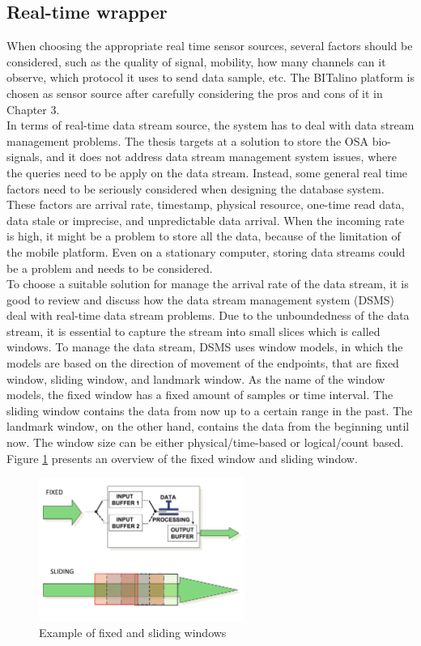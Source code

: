 \subsection{Real-time wrapper}
When choosing the appropriate real time sensor sources, several factors should be considered, such as the quality of signal, mobility, how many channels can it observe, which protocol it uses to send data sample, etc. The BITalino platform is chosen as sensor source after carefully considering the pros and cons of it in Chapter 3.\\
In terms of real-time data stream source, the system has to deal with data stream management problems. The thesis targets at a solution to store the OSA bio-signals, and it does not address data stream management system issues, where the queries need to be apply on the data stream. Instead, some general real time factors need to be seriously considered when designing the database system. These factors are arrival rate, timestamp, physical resource, one-time read data, data stale or imprecise, and unpredictable data arrival. When the incoming rate is high, it might be a problem to store all the data, because of the limitation of the mobile platform. Even on a stationary computer, storing data streams could be a problem and needs to be considered.\\
To choose a suitable solution for manage the arrival rate of the data stream, it is good to review and discuss how the data stream management system (DSMS) deal with real-time data stream problems. Due to the unboundedness of the data stream, it is essential to capture the stream into small slices which is called windows. To manage the data stream, DSMS uses window models, in which the models are based on the direction of movement of the endpoints, that are fixed window, sliding window, and landmark window. As the name of the window models, the fixed window has a fixed amount of samples or time interval. The sliding window contains the data from now up to a certain range in the past. The landmark window, on the other hand, contains the data from the beginning until now. The window size can be either physical/time-based or logical/count based. Figure \ref{fig:Figures/windows} presents an overview of the fixed window and sliding window.
\begin{figure}[ht]
    \centering
    \includegraphics[width=0.6\textwidth]{Figures/WINDOWDSMS.png}
    \caption{Example of fixed and sliding windows \cite{DSMS_WINDOW}}
    \label{fig:Figures/windows}
\end{figure}
